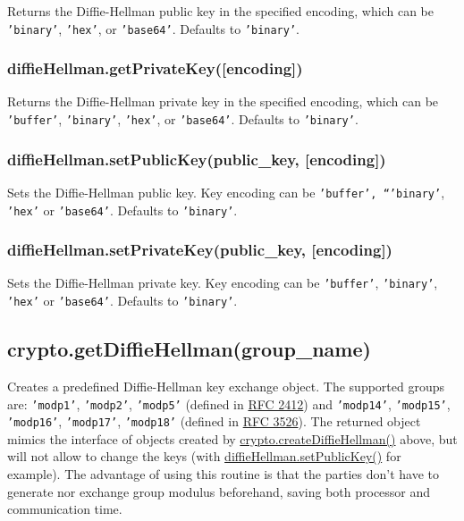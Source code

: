 Returns the Diffie-Hellman public key in the specified encoding, which
can be \texttt{'binary'}, \texttt{'hex'}, or \texttt{'base64'}. Defaults
to \texttt{'binary'}.

\subsubsection{diffieHellman.getPrivateKey({[}encoding{]})}

Returns the Diffie-Hellman private key in the specified encoding, which
can be \texttt{'buffer'}, \texttt{'binary'}, \texttt{'hex'}, or
\texttt{'base64'}. Defaults to \texttt{'binary'}.

\subsubsection{diffieHellman.setPublicKey(public\_key, {[}encoding{]})}

Sets the Diffie-Hellman public key. Key encoding can be
\texttt{'buffer', ``'binary'}, \texttt{'hex'} or \texttt{'base64'}.
Defaults to \texttt{'binary'}.

\subsubsection{diffieHellman.setPrivateKey(public\_key, {[}encoding{]})}

Sets the Diffie-Hellman private key. Key encoding can be
\texttt{'buffer'}, \texttt{'binary'}, \texttt{'hex'} or
\texttt{'base64'}. Defaults to \texttt{'binary'}.

\subsection{crypto.getDiffieHellman(group\_name)}

Creates a predefined Diffie-Hellman key exchange object. The supported
groups are: \texttt{'modp1'}, \texttt{'modp2'}, \texttt{'modp5'}
(defined in \href{http://www.rfc-editor.org/rfc/rfc2412.txt}{RFC 2412})
and \texttt{'modp14'}, \texttt{'modp15'}, \texttt{'modp16'},
\texttt{'modp17'}, \texttt{'modp18'} (defined in
\href{http://www.rfc-editor.org/rfc/rfc3526.txt}{RFC 3526}). The
returned object mimics the interface of objects created by
\hyperref[crypto\_crypto\_creatediffiehellman\_prime\_encoding]{crypto.createDiffieHellman()}
above, but will not allow to change the keys (with
\hyperref[crypto\_diffiehellman\_setpublickey\_public\_key\_encoding]{diffieHellman.setPublicKey()}
for example). The advantage of using this routine is that the parties
don't have to generate nor exchange group modulus beforehand, saving
both processor and communication time.

